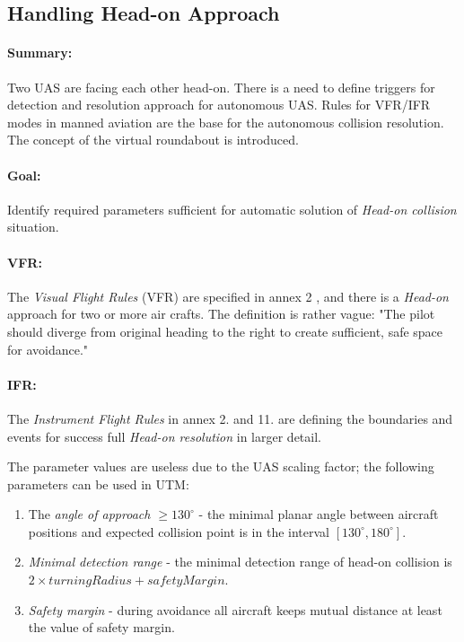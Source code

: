 \subsection{Handling Head-on Approach}\label{sec:handlingHeadOnApproach}

\paragraph{Summary:} Two UAS are facing each other head-on. There is a need to define triggers for detection and resolution approach for autonomous UAS.  Rules for VFR/IFR modes in manned aviation are the base for the autonomous collision resolution. The concept of the virtual roundabout is introduced.

\paragraph{Goal:} Identify required parameters sufficient for automatic solution of \emph{Head-on collision} situation.

\paragraph{VFR:} The \emph{Visual Flight Rules} (VFR) are specified in annex 2 \cite{icaoAnnex2}, and there is a \emph{Head-on} approach for two or more air crafts. The definition is rather vague: "The pilot should diverge from original heading to the right to create sufficient, safe space for avoidance." 

\paragraph{IFR:} The \emph{Instrument Flight Rules} in annex 2. \cite{icaoAnnex2} and 11. \cite{icaoAnnex11} are defining the boundaries and events for success full \emph{Head-on resolution} in larger detail. 

The parameter values are useless due to the UAS scaling factor; the following parameters can be used in UTM:

\begin{enumerate}
    \item The \emph{angle of approach $\ge 130^\circ$} - the minimal planar angle between aircraft positions and expected collision point is in the interval $[130^\circ,180^\circ]$.
    
    \item \emph{Minimal detection range} - the minimal detection range of head-on collision is $2\times turning Radius + safety Margin$.
    
    \item \emph{Safety margin} - during avoidance all aircraft keeps mutual distance at least the value of safety margin.
\end{enumerate}

